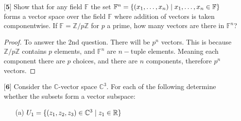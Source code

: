 \documentclass[12pt]{article}
\newcommand      {\Zm}         {{\mathbb Z}}
\newcommand      {\Rm}         {{\mathbb R}}
\newcommand      {\Fm}         {{\mathbb F}}
\begin{document}
\begin{itemize}
\begin{itemize}
\begin{proof}
        In this case those the coeffectients done for the imaginary componenet are is simply the 2nd comonponent in $\Rm^2$ and the real component of the the complex number lines up with the first comonponent of $\Rm^2$.

        We know $\Rm^2 = \Rm \times  \Rm$, we also know $\Rm$ is an abelian group under addition by definition of being a field. We know from group theory that the direct product of 2 abelian groups is also an abelian group. Therefore $\Rm^2$ under this defintion of addition and multiplication is indeed a field, more specifically the only way to make $\Rm^2$ into a field. 

    \end{proof}
    
    \end{itemize}
    
    \vspace{.5cm}
    
    \item[$\textbf{[5]}$]%
    Show that for any field $\mathbb{F}$ the set $\mathbb{F}^n = \{ (x_1,\dots,x_n) \hspace{.1cm} | \hspace{.1cm} x_1,\dots,x_n \in \mathbb{F} \}$ forms a vector space over the field $\mathbb{F}$ where addition of vectors is taken componentwise. If $\mathbb{F} = \mathbb{Z}/p\mathbb{Z}$ for $p$ a prime, how many vectors are there in $\mathbb{F}^n$?

    \begin{proof}
        To answer the 2nd question. There will be $p^n$ vectors. This is because $\Zm/p\Zm$ contains $p$ elements, and $\Fm^n$ are $n-$tuple elements. Meaning each component there are $p$ choices, and there are $n$ components, therefore $p^n$ vectors. 
    \end{proof}
    
    
    
    \item[$\textbf{[6]}$]%
    Consider the $\mathbb{C}$-vector space $\mathbb{C}^3$. For each of the following determine whether the subsets form a vector subspace:
    \begin{itemize}
    
    \vspace{.3cm}
    \item[(a)]
    $U_1 = \{ (z_1,z_2,z_3) \in \mathbb{C}^3 \hspace{.1cm} | \hspace{.1cm} z_1 \in \mathbb{R} \}$
    

\end{itemize}
\end{itemize}
\end{document}
